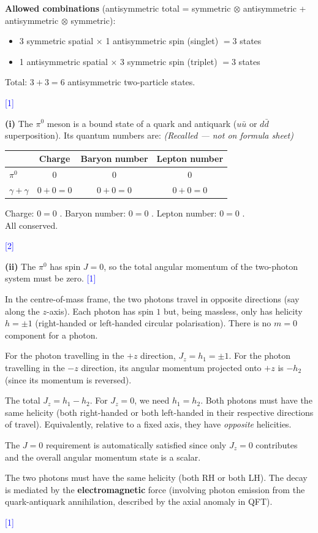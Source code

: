 \documentclass[12pt,a4paper]{article}
\newcommand{\markstep}[1]{\hfill\textcolor{blue}{[#1]}}
\newcommand{\finalanswer}[1]{%
  \begin{tcolorbox}[colback=green!5!white,colframe=green!50!black,boxrule=0.5pt]
  #1
  \end{tcolorbox}
}
\newcommand{\recalled}{\textit{(Recalled --- not on formula sheet)}}
\begin{document}
\begin{parts}
\textbf{Allowed combinations} (antisymmetric total = symmetric$\,\otimes\,$antisymmetric + antisymmetric$\,\otimes\,$symmetric):

\begin{itemize}
\item 3 symmetric spatial $\times$ 1 antisymmetric spin (singlet) $= 3$ states
\item 1 antisymmetric spatial $\times$ 3 symmetric spin (triplet) $= 3$ states
\end{itemize}

\finalanswer{Total: $3 + 3 = 6$ antisymmetric two-particle states.} \markstep{1}

\item

\textbf{(i)} The $\pi^0$ meson is a bound state of a quark and antiquark ($u\bar{u}$ or $d\bar{d}$ superposition). Its quantum numbers are: \recalled

\begin{center}
\begin{tabular}{lccc}
 & Charge & Baryon number & Lepton number \\
\hline
$\pi^0$ & 0 & 0 & 0 \\
$\gamma + \gamma$ & $0 + 0 = 0$ & $0 + 0 = 0$ & $0 + 0 = 0$ \\
\end{tabular}
\end{center}

\finalanswer{Charge: $0 = 0$ \checkmark. \quad Baryon number: $0 = 0$ \checkmark. \quad Lepton number: $0 = 0$ \checkmark. \\ All conserved.} \markstep{2}

\textbf{(ii)} The $\pi^0$ has spin $J = 0$, so the total angular momentum of the two-photon system must be zero. \markstep{1}

In the centre-of-mass frame, the two photons travel in opposite directions (say along the $z$-axis). Each photon has spin $1$ but, being massless, only has helicity $h = \pm 1$ (right-handed or left-handed circular polarisation). There is no $m = 0$ component for a photon.

For the photon travelling in the $+z$ direction, $J_z = h_1 = \pm 1$. For the photon travelling in the $-z$ direction, its angular momentum projected onto $+z$ is $-h_2$ (since its momentum is reversed).

The total $J_z = h_1 - h_2$. For $J_z = 0$, we need $h_1 = h_2$. Both photons must have the same helicity (both right-handed or both left-handed in their respective directions of travel). Equivalently, relative to a fixed axis, they have \emph{opposite} helicities.

The $J = 0$ requirement is automatically satisfied since only $J_z = 0$ contributes and the overall angular momentum state is a scalar.

\finalanswer{The two photons must have the same helicity (both RH or both LH). The decay is mediated by the \textbf{electromagnetic} force (involving photon emission from the quark-antiquark annihilation, described by the axial anomaly in QFT).} \markstep{1}

\end{parts}
\end{document}
